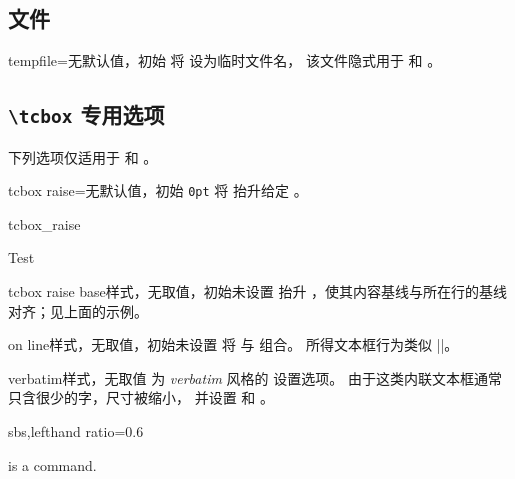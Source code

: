 \subsection{文件}
\begin{docTcbKey}{tempfile}{=}{无默认值，初始 }
  将  设为临时文件名，
  该文件隐式用于  和 。
\end{docTcbKey}

\clearpage
\subsection{\texttt{\textbackslash tcbox} 专用选项}
下列选项仅适用于  和 。

\begin{docTcbKey}{tcbox raise}{=}{无默认值，初始 \texttt{0pt}}
  将  抬升给定 。
\begin{exdispExample}{tcbox_raise}

Test\dotfill
{}\dotfill
{}\dotfill
{}
\end{exdispExample}
\end{docTcbKey}

\begin{docTcbKey}{tcbox raise base}{}{样式，无取值，初始未设置}
  抬升 ，使其内容基线与所在行的基线对齐；见上面的示例。
\end{docTcbKey}

\begin{docTcbKey}{on line}{}{样式，无取值，初始未设置}
  将  与  组合。
  所得文本框行为类似 |\fbox|。
\end{docTcbKey}

\begin{docTcbKey}{verbatim}{}{样式，无取值}
  为 \textit{verbatim} 风格的  设置选项。
  由于这类内联文本框通常只含很少的字，尺寸被缩小，
  并设置  和 。
\begin{dispExample*}{sbs,lefthand ratio=0.6}

\myverb{\textbf} is a \myverb{\LaTeX} command.
\end{dispExample*}
\end{docTcbKey}



